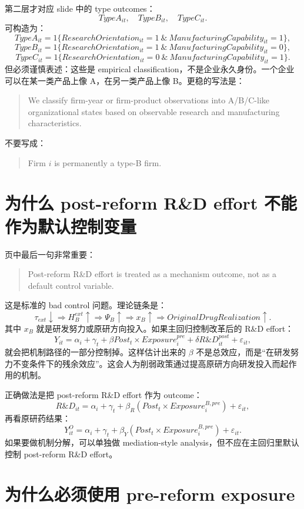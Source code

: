 \documentclass[12pt]{ctexart}
\begin{document}
第二层才对应 slide 中的 type outcomes：
\[
TypeA_{it},\quad TypeB_{it},\quad TypeC_{it}.
\]
可构造为：
\[
TypeA_{it}=1\{ResearchOrientation_{it}=1\ \&\ ManufacturingCapability_{it}=1\},
\]
\[
TypeB_{it}=1\{ResearchOrientation_{it}=1\ \&\ ManufacturingCapability_{it}=0\},
\]
\[
TypeC_{it}=1\{ResearchOrientation_{it}=0\ \&\ ManufacturingCapability_{it}=1\}.
\]
但必须谨慎表述：这些是 empirical classification，不是企业永久身份。一个企业可以在某一类产品上像 A，在另一类产品上像 B。更稳的写法是：
\begin{quote}
We classify firm-year or firm-product observations into A/B/C-like organizational states based on observable research and manufacturing characteristics.
\end{quote}
不要写成：
\begin{quote}
Firm $i$ is permanently a type-B firm.
\end{quote}

\section{为什么 post-reform R\&D effort 不能作为默认控制变量}

页中最后一句非常重要：
\begin{quote}
Post-reform R\&D effort is treated as a mechanism outcome, not as a default control variable.
\end{quote}
这是标准的 bad control 问题。理论链条是：
\[
\tau_{ext}\downarrow \Rightarrow H_B^{ext}\uparrow \Rightarrow \Psi_B\uparrow \Rightarrow x_B\uparrow \Rightarrow OriginalDrugRealization\uparrow.
\]
其中 $x_B$ 就是研发努力或原研方向投入。如果主回归控制改革后的 R\&D effort：
\[
Y_{it}=\alpha_i+\gamma_t+\beta Post_t\times Exposure_i^{pre}+\delta R\&D_{it}^{post}+\varepsilon_{it},
\]
就会把机制路径的一部分控制掉。这样估计出来的 $\beta$ 不是总效应，而是“在研发努力不变条件下的残余效应”。这会人为削弱政策通过提高原研方向研发投入而起作用的机制。

正确做法是把 post-reform R\&D effort 作为 outcome：
\[
R\&D_{it}=\alpha_i+\gamma_t+\beta_R(Post_t\times Exposure_i^{B,pre})+\varepsilon_{it},
\]
再看原研药结果：
\[
Y_{it}^{O}=\alpha_i+\gamma_t+\beta_Y(Post_t\times Exposure_i^{B,pre})+\varepsilon_{it}.
\]
如果要做机制分解，可以单独做 mediation-style analysis，但不应在主回归里默认控制 post-reform R\&D effort。

\section{为什么必须使用 pre-reform exposure}
\end{document}
